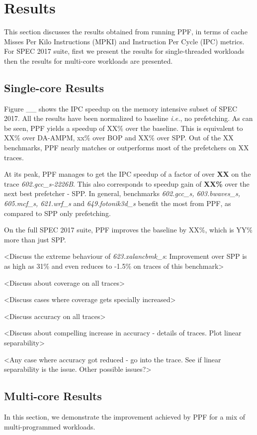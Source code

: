 \section{Results}
\label{Results}

This section discusses the results obtained from running PPF, in
terms of cache Misses Per Kilo Instructions (MPKI) and Instruction Per
Cycle (IPC) metrics.  For SPEC 2017 suite, first we present the
results for single-threaded workloads then the results for multi-core
workloads are presented.

\subsection{Single-core Results}
\label{Results-Single}

Figure \_\_ shows the IPC speedup on the memory intensive subset of SPEC 2017. 
All the results have been normalized to baseline \textit{i.e.}, no
prefetching.  As can be seen, PPF yields a speedup of XX\% over
the baseline.  This is equivalent to XX\% over DA-AMPM, xx\% over BOP
and XX\% over SPP.  Out of the XX benchmarks, PPF nearly matches
or outperforms most of the prefetchers on XX traces.

At its peak, PPF manages to get the IPC speedup of a factor of
over \textbf{XX} on the trace \textit{602.gcc\_s-2226B}.  This also
corresponds to speedup gain of \textbf{XX\%} over the next best
prefetcher - SPP.  In general, benchmarks \textit{602.gcc\_s,
  603.bwaves\_s, 605.mcf\_s, 621.wrf\_s} and \textit{649.fotonik3d\_s}
benefit the most from PPF, as compared to SPP only prefetching.

On the full SPEC 2017 suite, PPF improves the baseline by XX\%,
which is YY\% more than just SPP.

<Discuss the extreme behaviour of \textit{623.xalancbmk\_s}:
Improvement over SPP is as high as 31\% and even reduces to -1.5\% on
traces of this benchmark>

<Discuss about coverage on all traces>

<Discuss cases where coverage gets specially increased>

<Discuss accuracy on all traces>

<Discuss about compelling increase in accuracy - details of
traces. Plot linear separability>

<Any case where accuracy got reduced - go into the trace. See if
linear separability is the issue. Other possible issues?>


\subsection{Multi-core Results}
\label{Results-Multi}
In this section, we demonstrate the improvement achieved by PPF
for a mix of multi-programmed workloads.

